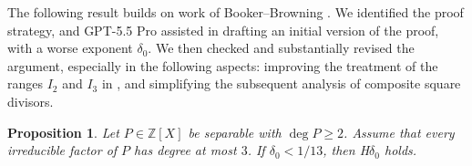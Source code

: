 \documentclass[reqno, 12pt]{amsart}
\theoremstyle{plain}
\newtheorem{proposition}[theorem]{Proposition}
\theoremstyle{definition}
\theoremstyle{remark}
\renewcommand{\ge}{\geqslant}
\begin{document}
The following result builds on
work of Booker--Browning \cite[\S4]{BookerBrowning}.
We identified the proof strategy, and
GPT-5.5 Pro assisted in drafting an initial version of the proof,
with a worse exponent $\delta_0$.
We then checked and substantially revised the argument,
especially in the following aspects:
improving the treatment of the ranges $I_2$ and $I_3$ in \cite[\S4]{BookerBrowning},
and simplifying the subsequent analysis of composite square divisors.

\begin{proposition}
\label{large-squares}
Let \(P\in \mathbb Z[X]\) be separable with $\deg{P}\ge 2$.
Assume that every irreducible factor of \(P\) has degree at most \(3\).
If \(\delta_0<1/13\),
then H$\delta_0$ holds.
\end{proposition}
\end{document}
